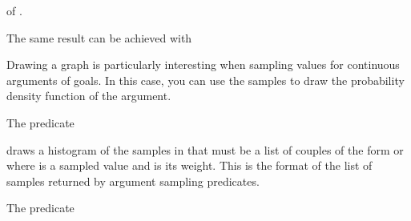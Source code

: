 \documentclass[letterpaper,10pt,english]{sphinxmanual}
\begin{document}
\sphinxAtStartPar
of .

\sphinxAtStartPar
The same result can be achieved with

\begin{sphinxVerbatim}[commandchars=\\\{\}]
 
\end{sphinxVerbatim}

\sphinxAtStartPar
Drawing a graph is particularly interesting when sampling values for continuous arguments of goals.
In this case, you can use the samples to draw the probability density function of the argument.

\sphinxAtStartPar
The predicate

\begin{sphinxVerbatim}[commandchars=\\\{\}]
  
\end{sphinxVerbatim}

\sphinxAtStartPar
draws a histogram of the samples in  that must be a list of couples of the form  or  where  is a sampled value and  is its weight.
This is the format of the list of samples returned by argument sampling predicates.

\sphinxAtStartPar
The predicate

\begin{sphinxVerbatim}[commandchars=\\\{\}]
  
\end{sphinxVerbatim}
\end{document}
